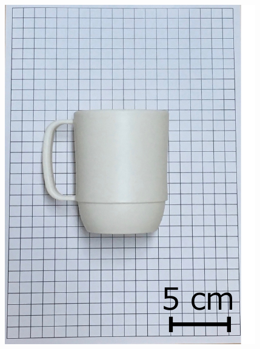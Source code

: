 \begin{figure}[H]
\begin{minipage}{0.19\columnwidth}
        \includegraphics[clip, width=\linewidth]{figure/chapter4/cup2}
    \end{minipage}
    \begin{minipage}{0.19\columnwidth}
        \centering

\end{minipage}
\end{figure}

